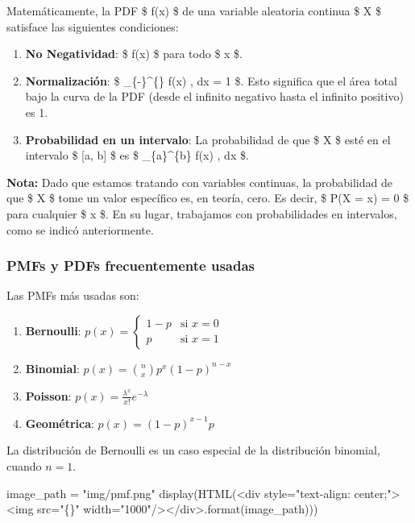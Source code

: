 \documentclass[
  letterpaper,
  DIV=11,
  numbers=noendperiod]{scrartcl}
\newenvironment{Shaded}{\begin{snugshade}}{\end{snugshade}}
\newcommand{\BuiltInTok}[1]{\textcolor[rgb]{0.00,0.23,0.31}{#1}}
\newcommand{\NormalTok}[1]{\textcolor[rgb]{0.00,0.23,0.31}{#1}}
\newcommand{\OperatorTok}[1]{\textcolor[rgb]{0.37,0.37,0.37}{#1}}
\newcommand{\SpecialCharTok}[1]{\textcolor[rgb]{0.37,0.37,0.37}{#1}}
\newcommand{\StringTok}[1]{\textcolor[rgb]{0.13,0.47,0.30}{#1}}
\providecommand{\tightlist}{%
  \setlength{\itemsep}{0pt}\setlength{\parskip}{0pt}}\usepackage{longtable,booktabs,array}
\begin{document}
Matemáticamente, la PDF \$ f(x) \$ de una variable aleatoria continua \$
X \$ satisface las siguientes condiciones:

\begin{enumerate}
\def\labelenumi{\arabic{enumi}.}
\tightlist
\item
  \textbf{No Negatividad}: \$ f(x)  \$ para todo \$ x \$.
\item
  \textbf{Normalización}: \$ \int\_\{-\infty\}\^{}\{\infty\} f(x) , dx =
  1 \$. Esto significa que el área total bajo la curva de la PDF (desde
  el infinito negativo hasta el infinito positivo) es 1.
\item
  \textbf{Probabilidad en un intervalo}: La probabilidad de que \$ X \$
  esté en el intervalo \$ {[}a, b{]} \$ es \$ \int\_\{a\}\^{}\{b\} f(x)
  , dx \$.
\end{enumerate}

\textbf{Nota:} Dado que estamos tratando con variables continuas, la
probabilidad de que \$ X \$ tome un valor específico es, en teoría,
cero. Es decir, \$ P(X = x) = 0 \$ para cualquier \$ x \$. En su lugar,
trabajamos con probabilidades en intervalos, como se indicó
anteriormente.

\hypertarget{pmfs-y-pdfs-frecuentemente-usadas}{%
\subsubsection{PMFs y PDFs frecuentemente
usadas}\label{pmfs-y-pdfs-frecuentemente-usadas}}

Las PMFs más usadas son:

\begin{enumerate}
\def\labelenumi{\arabic{enumi}.}
\tightlist
\item
  \textbf{Bernoulli}:
  \(p(x) = \begin{cases} 1-p & \text{si } x=0 \\ p & \text{si } x=1 \end{cases}\)
\item
  \textbf{Binomial}: \(p(x) = \binom{n}{x}p^x(1-p)^{n-x}\)
\item
  \textbf{Poisson}: \(p(x) = \frac{\lambda^x}{x!}e^{-\lambda}\)
\item
  \textbf{Geométrica}: \(p(x) = (1-p)^{x-1}p\)
\end{enumerate}

La distribución de Bernoulli es un caso especial de la distribución
binomial, cuando \(n=1\).

\begin{Shaded}
\begin{Highlighting}[]
\NormalTok{image\_path }\OperatorTok{=} \StringTok{"img/pmf.png"}
\NormalTok{display(HTML(}\StringTok{\textquotesingle{}\textless{}div style="text{-}align: center;"\textgreater{}\textless{}img src="}\SpecialCharTok{\{\}}\StringTok{" width="1000"/\textgreater{}\textless{}/div\textgreater{}\textquotesingle{}}\NormalTok{.}\BuiltInTok{format}\NormalTok{(image\_path)))}
\end{Highlighting}
\end{Shaded}
\end{document}
